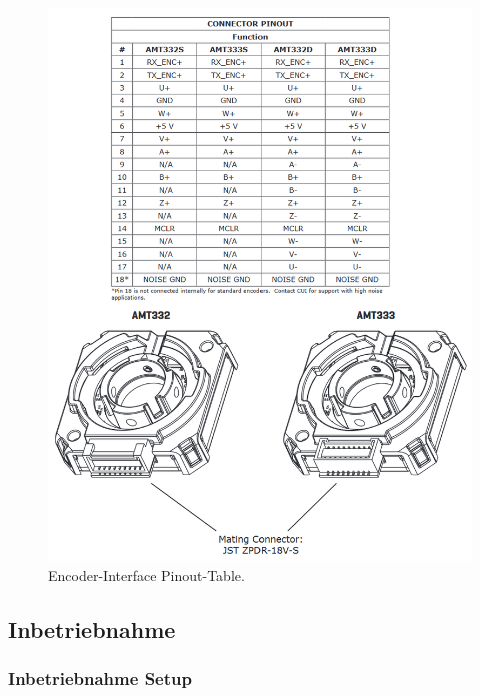 \begin{appendix}
\begin{figure}[h!]
	\centering
	\includegraphics[width=\textwidth]{graphics/Encoder_Interface}
	\caption{Encoder-Interface Pinout-Table.}
	\label{fig:Encoder_Interface}
\end{figure}

\newpage

\subsection{Inbetriebnahme}

\subsubsection{Inbetriebnahme Setup}\label{Appendix:ABN_Setup}


\end{appendix}
